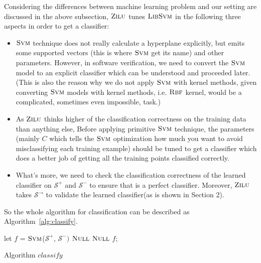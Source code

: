 Considering the differences between machine learning problem and our setting are discussed in the above subsection, 
$\textsc{Zilu}$ tunes $\textsc{LibSvm}$ in the following three aspects in order to get a classifier: 
\begin{itemize}
\item $\textsc{Svm}$ technique does not really calculate a hyperplane explicitly, 
but emits some supported vectors (this is where $\textsc{Svm}$ get its name) and other parameters.
However, in software verification, we need to convert the $\textsc{Svm}$ model to an explicit classifier which can be understood and proceeded later.
(This is also the reason why we do not apply $\textsc{Svm}$ with kernel methods,
given converting $\textsc{Svm}$ models with kernel methods, i.e. $\textsc{Rbf}$ kernel, would be a complicated, sometimes even impossible, task.)

\item As $\textsc{Zilu}$ thinks higher of the classification correctness on the training data than anything else,
Before applying primitive $\textsc{Svm}$ technique, the parameters 
(mainly $C$ which tells the $\textsc{Svm}$ optimization how much you want to avoid misclassifying each training example)
should be tuned to get a classifier which does a better job of getting all the training points classified correctly.

\item What's more, we need to check the classification correctness of the learned classifier 
on $\mathcal{S}^+$ and $\mathcal{S}^-$ to ensure that is a perfect classifier.
Moreover, $\textsc{Zilu}$ takes $\mathcal{S}^\rightarrow$ to validate the learned classifier(as is shown in Section 2).
\end{itemize} 

So the whole algorithm for classification can be described as Algorithm~\ref{alg:classify}.

\begin{algorithm}[!h]
\SetAlgoVlined
\Indm
{}
\Indp
    let $f$ = $\textsc{Svm}$($\mathcal{S}^+$, $\mathcal{S}^-)$\;
     {
        \Return $\textsc{Null}$\;
    }
     {
        \Return $\textsc{Null}$\;
    }
    \Return $f$;
\caption{Algorithm $classify$}
\label{alg:classify}
\end{algorithm}

